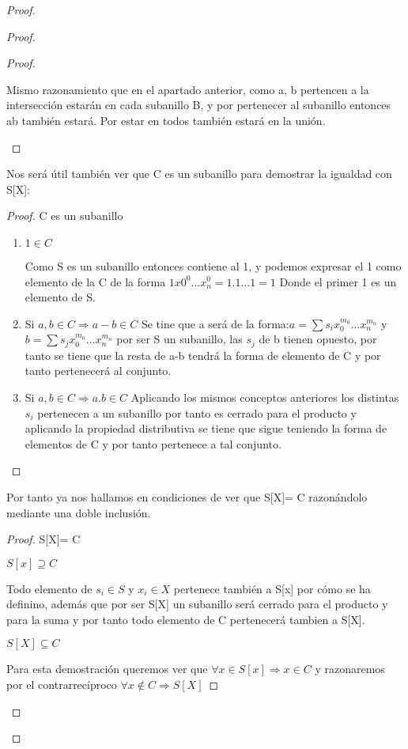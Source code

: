 \begin{proof}
\begin{proof}
\begin{proof}
\begin{enumerate}
Mismo razonamiento que en el apartado anterior, como a, b pertencen a la intersección estarán en cada subanillo B, y por pertenecer al subanillo entonces ab también estará.
Por estar en todos también estará en la unión.

\end{enumerate}
\end {proof}

Nos será útil también ver que C es un subanillo para demostrar la igualdad con S[X]:
\begin{proof}
C es un subanillo

\begin{enumerate}
\item $1 \in C$

Como S es un subanillo entonces contiene al 1, y podemos expresar el 1 como elemento de la C de la forma $1 x0^0...x_n^0 = 1.1...1 = 1$  Donde el primer 1 es un elemento de S.

\item Si $a,b \in C \Rightarrow a-b \in C $
Se tine que a será de la forma:$ a= \sum s_i x_{0}^{m_0} ...x_{n}^{m_n} $ y $b=\sum s_j x_{0}^{m_0} ...x_{n}^{m_n} $ por ser S un subanillo, las $s_j$ de b tienen opuesto, por tanto se tiene que la resta de a-b tendrá la forma de elemento de C y por tanto pertenecerá al conjunto.

 \item Si $a,b \in C \Rightarrow a.b \in C $
 Aplicando los mismos conceptos anteriores los distintas $s_i$ pertenecen a un subanillo por tanto es cerrado para el producto y aplicando la propiedad distributiva se tiene que sigue teniendo la forma de elementos de C y por tanto pertenece a tal conjunto.
\end{enumerate}
\end{proof}

Por tanto ya nos hallamos en condiciones de ver que S[X]= C razonándolo mediante una doble inclusión.
\begin{proof}
S[X]= C


$ S[x] \supseteq C $

Todo elemento de $s_i \in S $ y $x_i \in X$ pertenece también a S[x] por cómo se ha definino, además que por ser S[X] un subanillo será cerrado para el producto y para la suma y
por tanto todo elemento de C pertenecerá tambien a S[X].

$ S[X] \subseteq C$

Para esta demostración queremos ver que $ \forall x \in S[x] \Rightarrow x  \in C$ y razonaremos por el contrarrecíproco $\forall x \notin C \Rightarrow S[X]$


\end{proof}
\end{proof}
\end{proof}
